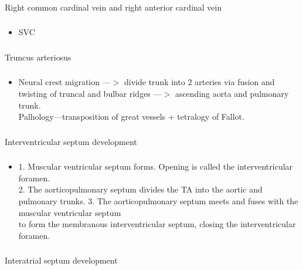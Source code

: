 \documentclass[11pt]{beamer}
\begin{document}
\begin{frame}
 \frametitle{}
Right common cardinal vein and right anterior cardinal vein 
\end{frame}

\begin{frame}
 \frametitle{}
\begin{itemize}
\item{SVC}
\end{itemize}
\end{frame}

\begin{frame}
 \frametitle{}
Truncus arteriosus
\end{frame}

\begin{frame}
 \frametitle{}
\begin{itemize}
\item{Neural crest migration —$>$ divide trunk into 2 arteries via fusion and twisting of truncal and bulbar ridges —$>$ ascending aorta and pulmonary trunk. \\ Palhology—transposition of great vessels + tetralogy of Fallot.}
\end{itemize}
\end{frame}

\begin{frame}
 \frametitle{}
Interventricular septum development
\end{frame}

\begin{frame}
 \frametitle{}
\begin{itemize}
\item{1. Muscular ventricular septum forms. Opening is called the interventricular foramen. \\ 2. The aorticopulmonary septum divides the TA into the aortic and pulmonary trunks. 3. The aorticopulmonary septum meets and fuses with the muscular ventricular septum \\ to form the membranous interventricular septum, closing the interventricular foramen.}
\end{itemize}
\end{frame}

\begin{frame}
 \frametitle{}
Interatrial septum development
\end{frame}
\end{document}
